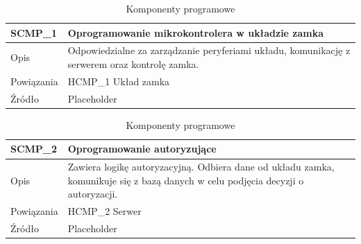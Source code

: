                 \begin{table}
                    \caption{Komponenty programowe}
                    \centering
                    \begin{subtable}[c]{\textwidth}
                        \centering
                        \begin{tabular}{|p{2cm}|p{12cm}|}
                            \hline SCMP\_1      & \textbf{Oprogramowanie mikrokontrolera w układzie zamka} \\
                            \hline \cellcolor[gray]{0.8} Opis         & Odpowiedzialne za zarządzanie peryferiami układu, komunikację z serwerem oraz kontrolę zamka.  \\
                            \hline \cellcolor[gray]{0.8} Powiązania   & HCMP\_1 Układ zamka    \\
                            \hline \cellcolor[gray]{0.8} Źródło       & Placeholder    \\
                            \hline
                        \end{tabular}
                        \label{tbl:scmp1}
                        \vspace{10mm}           
                    \end{subtable}
                \quad%
                    \begin{subtable}[c]{\textwidth}
                        \centering
                        \begin{tabular}{|p{2cm}|p{12cm}|}
                            \hline SCMP\_2      & \textbf{Oprogramowanie autoryzujące} \\
                            \hline \cellcolor[gray]{0.8} Opis         & Zawiera logikę autoryzacyjną. Odbiera dane od układu zamka, komunikuje się z bazą danych w celu podjęcia decyzji o autoryzacji. \\
                            \hline \cellcolor[gray]{0.8} Powiązania   & HCMP\_2 Serwer    \\
                            \hline \cellcolor[gray]{0.8} Źródło       & Placeholder    \\
                            \hline
                        \end{tabular}
                        \label{tbl:scmp2}
                        \vspace{10mm}           
                    \end{subtable}
                \quad%
                    \begin{subtable}[c]{\textwidth}

\end{subtable}
\end{table}

